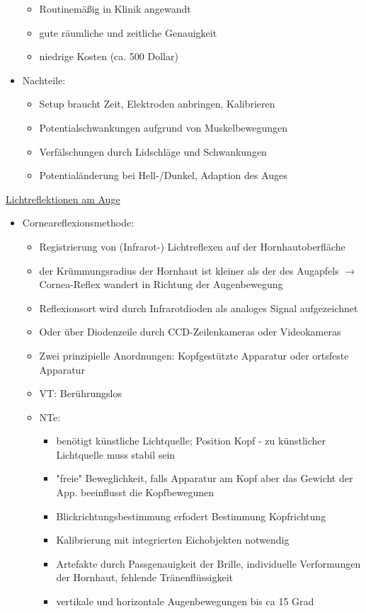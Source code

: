 \documentclass[a4paper,10pt,oneside]{article}
\begin{document}
\begin{itemize}
\begin{itemize}
				\item Routinemäßig in Klinik angewandt 
				\item gute räumliche und zeitliche Genauigkeit
				\item niedrige Kosten (ca. 500 Dollar)
			\end{itemize}
		\item Nachteile:
			\begin{itemize}
				\item Setup braucht Zeit, Elektroden anbringen, Kalibrieren
				\item Potentialschwankungen aufgrund von Muskelbewegungen
				\item Verfälschungen durch Lidschläge und Schwankungen
				\item Potentialänderung bei Hell-/Dunkel, Adaption des Auges
			\end{itemize}
	\end{itemize}

\underline{Lichtreflektionen am Auge} \\
	\begin{itemize}
		\item Corneareflexionsmethode:
			\begin{itemize}
				\item Registrierung von (Infrarot-) Lichtreflexen auf der Hornhautoberfläche 
				\item der Krümmungsradius der Hornhaut ist kleiner als der des Augapfels $\rightarrow$ Cornea-Reflex wandert in Richtung der Augenbewegung
				\item Reflexionsort wird durch Infrarotdioden als analoges Signal aufgezeichnet
				\item Oder über Diodenzeile durch CCD-Zeilenkameras oder Videokameras
				\item Zwei prinzipielle Anordnungen: Kopfgestützte Apparatur oder ortsfeste Apparatur
				\item VT: Berührungslos
				\item NTe: 
					\begin{itemize}
						\item benötigt künstliche Lichtquelle; Position Kopf - zu künstlicher Lichtquelle muss stabil sein 
						\item "freie" Beweglichkeit, falls Apparatur am Kopf aber das Gewicht der App. beeinflusst die Kopfbewegunen
						\item Blickrichtungsbestimmung erfodert Bestimmung Kopfrichtung
						\item Kalibrierung mit integrierten Eichobjekten notwendig
						\item Artefakte durch Passgenauigkeit der Brille, individuelle Verformungen der Hornhaut, fehlende Tränenflüssigkeit
						\item vertikale und horizontale Augenbewegungen bis ca 15 Grad
					\end{itemize}
			\end{itemize}
	\end{itemize}
	
\end{document}
